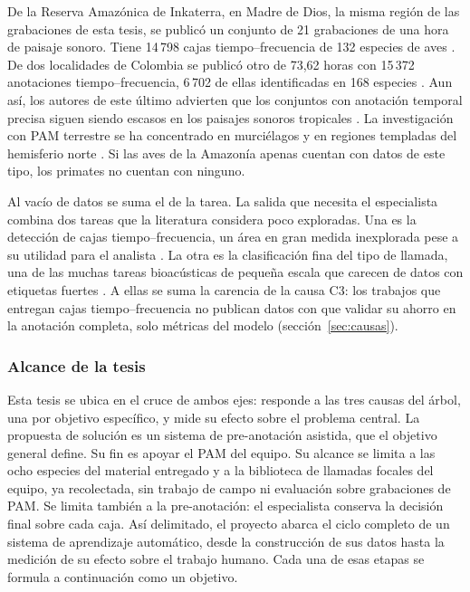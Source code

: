De la Reserva Amazónica de Inkaterra, en Madre de Dios, la misma región de las
grabaciones de esta tesis, se publicó un conjunto de 21 grabaciones de una hora
de paisaje sonoro. Tiene 14\,798 cajas tiempo--frecuencia de 132 especies de aves
\citep{hopping_collection_2022}. De dos localidades de Colombia se publicó otro de
73,62 horas con 15\,372 anotaciones tiempo--frecuencia, 6\,702 de ellas
identificadas en 168 especies \citep{ruiz_pteroset_2026}. Aun así, los autores de
este último advierten que los conjuntos con anotación temporal precisa siguen
siendo escasos en los paisajes sonoros tropicales \citep{ruiz_pteroset_2026}. La
investigación con PAM terrestre se ha concentrado en murciélagos y en regiones
templadas del hemisferio norte \citep{sugai_terrestrial_2019}. Si las aves de la
Amazonía apenas cuentan con datos de este tipo, los primates no cuentan con
ninguno.

 Al vacío de datos se suma el de la tarea. La salida que
necesita el especialista combina dos tareas que la literatura considera poco
exploradas. Una es la detección de cajas tiempo--frecuencia, un área en gran
medida inexplorada pese a su utilidad para el analista \citep{zhu_sound_2025}. La
otra es la clasificación fina del tipo de llamada, una de las muchas tareas
bioacústicas de pequeña escala que carecen de datos con etiquetas fuertes
\citep{nolasco_learning_2023}. A ellas se suma la carencia de la causa C3: los
trabajos que entregan cajas tiempo--frecuencia no publican datos con que validar
su ahorro en la anotación completa, solo métricas del modelo
(sección~\ref{sec:causas}).

\subsubsection{Alcance de la tesis}
\label{sec:alcance-tesis}

Esta tesis se ubica en el cruce de ambos ejes: responde a las tres causas del
árbol, una por objetivo específico, y mide su efecto sobre el problema central. La
propuesta de solución es un sistema de pre-anotación asistida, que el objetivo
general define. Su fin es apoyar el PAM del equipo. Su alcance se limita a las
ocho especies del material entregado y a la biblioteca de llamadas focales del
equipo, ya recolectada, sin trabajo de campo ni evaluación sobre grabaciones de
PAM. Se limita también a la pre-anotación: el especialista conserva la decisión
final sobre cada caja. Así delimitado, el proyecto abarca el ciclo completo de un
sistema de aprendizaje automático, desde la construcción de sus datos hasta la
medición de su efecto sobre el trabajo humano. Cada una de esas etapas se formula
a continuación como un objetivo.

